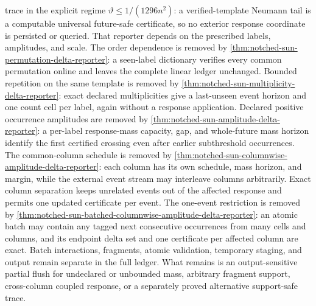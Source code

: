 trace in the explicit regime
$\vartheta\leq1/(1296n^2)$: a verified-template Neumann tail is a computable
universal future-safe certificate, so no exterior response coordinate is
persisted or queried.  That reporter depends on the prescribed labels,
amplitudes, and scale.  The order dependence is removed by
\cref{thm:notched-sun-permutation-delta-reporter}: a seen-label dictionary
verifies every common permutation online and leaves the complete linear
ledger unchanged.  Bounded repetition on the same template is removed by
\cref{thm:notched-sun-multiplicity-delta-reporter}: exact declared
multiplicities give a last-unseen event horizon and one count cell per label,
again without a response application.  Declared positive occurrence
amplitudes are removed by
\cref{thm:notched-sun-amplitude-delta-reporter}: a per-label response-mass
capacity, gap, and whole-future mass horizon identify the first certified
crossing even after earlier subthreshold occurrences.  The common-column
schedule is removed by
\cref{thm:notched-sun-columnwise-amplitude-delta-reporter}: each column has
its own schedule, mass horizon, and margin, while the external event stream
may interleave columns arbitrarily.  Exact column separation keeps unrelated
events out of the affected response and permits one updated certificate per
event.  The one-event restriction is removed by
\cref{thm:notched-sun-batched-columnwise-amplitude-delta-reporter}: an atomic
batch may contain any tagged next consecutive occurrences from many cells and
columns, and its endpoint delta set and one certificate per affected column
are exact.  Batch interactions, fragments, atomic validation, temporary
staging, and output remain separate in the full ledger.  What remains is an
output-sensitive partial flush for undeclared or unbounded mass, arbitrary
fragment support, cross-column coupled response, or a separately proved
alternative support-safe trace.
